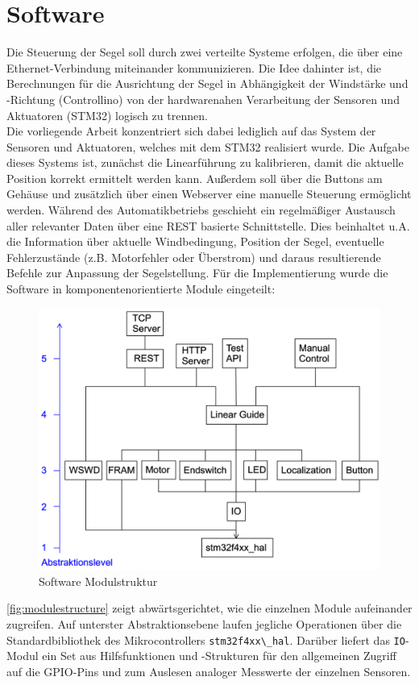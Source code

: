 \section{Software}
Die Steuerung der Segel soll durch zwei verteilte Systeme erfolgen, die über eine Ethernet-Verbindung miteinander kommunizieren. Die Idee dahinter ist, die Berechnungen für die Ausrichtung der Segel in Abhängigkeit der Windstärke und -Richtung (Controllino) von der hardwarenahen Verarbeitung der Sensoren und Aktuatoren (STM32) logisch zu trennen. \\

\noindent
Die vorliegende Arbeit konzentriert sich dabei lediglich auf das System der Sensoren und Aktuatoren, welches mit dem STM32 realisiert wurde. Die Aufgabe dieses Systems ist, zunächst die Linearführung zu kalibrieren, damit die aktuelle Position korrekt ermittelt werden kann. Außerdem soll über die Buttons am Gehäuse und zusätzlich über einen Webserver eine manuelle Steuerung ermöglicht werden. Während des Automatikbetriebs geschieht ein regelmäßiger Austausch aller relevanter Daten über eine REST basierte Schnittstelle. Dies beinhaltet u.A. die Information über aktuelle Windbedingung, Position der Segel, eventuelle Fehlerzustände (z.B. Motorfehler oder Überstrom) und daraus resultierende Befehle zur Anpassung der Segelstellung.
Für die Implementierung wurde die Software in komponentenorientierte Module eingeteilt:
\begin{figure}[H]
	\centering
	\includegraphics[width=0.6\linewidth]{images/Software/Modulestructure.png}
	\caption{Software Modulstruktur}
	\label{fig:modulestructure}
\end{figure}
\noindent
\autoref{fig:modulestructure} zeigt abwärtsgerichtet, wie die einzelnen Module aufeinander zugreifen. Auf unterster Abstraktionsebene laufen jegliche Operationen über die Standardbibliothek des Mikrocontrollers \verb|stm32f4xx\_hal|. Darüber liefert das \verb|IO|-Modul ein Set aus Hilfsfunktionen und -Strukturen für den allgemeinen Zugriff auf die \ac{GPIO}-Pins und zum Auslesen analoger Messwerte der einzelnen Sensoren.\\


